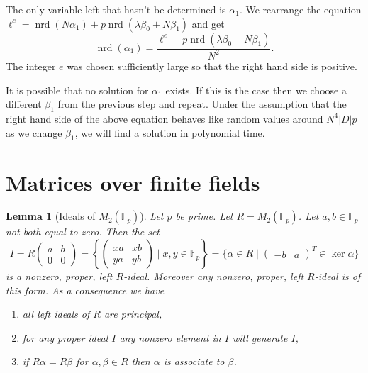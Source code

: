 \documentclass[10pt]{article}
\theoremstyle{plain}
\newtheorem{lemma}[theorem]{Lemma}
\theoremstyle{definition}
\newcommand{\op}{\operatorname}
\newcommand{\F}{\mathbb{F}}
\newcommand{\nrd}{\op{nrd}}
\begin{document}
The only variable left that hasn't be determined is \( \alpha_1 \).
We rearrange the equation \( \ell^e = \nrd(N\alpha_1) +p\nrd(\lambda\beta_0 + N\beta_1) \) and get
\[
    \nrd(\alpha_1)
    = \frac{\ell^e - p\nrd(\lambda\beta_0 + N\beta_1)}{N^2}.
\]
The integer \( e \) was chosen sufficiently large so that the right hand side is positive.

It is possible that no solution for \( \alpha_1 \) exists.
If this is the case then we choose a different \( \beta_1 \) from the previous step and repeat.
Under the assumption that the right hand side of the above equation behaves like random values around \( N^4|D|p \) as we change \( \beta_1 \), we will find a solution in polynomial time.

\appendix
\section{Matrices over finite fields}
\begin{lemma}[Ideals of \( M_2(\F_p) \)] \label{lem: ideals of M2}
    Let \( p \) be prime.
    Let \( R =  M_2(\F_p) \).
    Let \( a, b \in \F_p \) not both equal to zero.
    Then the set
    \[
        I = R
        \begin{pmatrix}
            a & b \\
            0 & 0
        \end{pmatrix}
        = \left\{
        \begin{pmatrix}
            xa & xb \\
            ya & yb
        \end{pmatrix}
        \mid x, y \in \F_p\right\}
        = \{\alpha \in R \mid \begin{pmatrix}-b & a \end{pmatrix}^T \in \ker \alpha \}
    \]
    is a nonzero, proper, left \( R \)-ideal.
    Moreover any nonzero, proper, left \( R \)-ideal is of this form.
    As a consequence we have
    \begin{enumerate}
        \item all left ideals of \( R \) are principal,
        \item for any proper ideal \( I \) any nonzero element in \( I \) will generate \( I \),
        \item if \( R\alpha = R\beta \) for \( \alpha, \beta \in R \) then \( \alpha \) is associate to \( \beta \).
    \end{enumerate}
\end{lemma}
\end{document}
